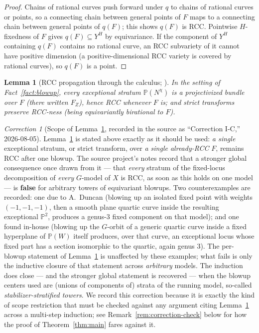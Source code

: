 \documentclass[11pt]{article}
\theoremstyle{plain}
\newtheorem{lemma}[theorem]{Lemma}
\theoremstyle{definition}
\theoremstyle{remark}
\newtheorem{correction}[theorem]{Correction}
\newcommand{\PP}{\mathbb P}
\begin{document}
\begin{proof}
Chains of rational curves push forward under $q$ to chains of rational
curves or points, so a connecting chain between general points of $F$
maps to a connecting chain between general points of $q(F)$; this
shows $q(F)$ is RCC. Pointwise $H$-fixedness of $F$ gives $q(F)\subseteq
Y^H$ by equivariance. If the component of $Y^H$ containing $q(F)$
contains no rational curve, an RCC subvariety of it cannot have
positive dimension (a positive-dimensional RCC variety is covered by
rational curves), so $q(F)$ is a point.
\end{proof}

\begin{lemma}[RCC propagation through the calculus; {\cite[Lem.\
4.3]{BComplex}}] \label{lem:rccprop} In the setting of
Fact~\ref{fact:blowup}, every exceptional stratum $\PP(N^\chi)$ is a
projectivized bundle over $F$ (there written $F_Z$), hence RCC whenever
$F$ is; and strict transforms preserve RCC-ness (being equivariantly
birational to $F$).
\end{lemma}

\begin{correction}[Scope of Lemma~\ref{lem:rccprop}, recorded in the
source as ``Correction I-C,'' 2026-08-05]
\label{corr:ic}
Lemma~\ref{lem:rccprop} is stated above exactly as it should be used:
\emph{a single} exceptional stratum, or strict transform, over \emph{a
single already-RCC} $F$, remains RCC after one blowup. The source
project's notes record that a stronger global consequence once drawn
from it --- that \emph{every} stratum of the fixed-locus decomposition
of \emph{every} $G$-model of $X$ is RCC, as soon as this holds on one
model --- is \textbf{false} for arbitrary towers of equivariant
blowups. Two counterexamples are recorded: one due to A.\ Duncan
(blowing up an isolated fixed point with weights $(-1,-1,-1)$, then a
smooth plane quartic curve inside the resulting exceptional $\PP^2$,
produces a genus-$3$ fixed component on that model); and one found
in-house (blowing up the $G$-orbit of a generic quartic curve inside a
fixed hyperplane of $\PP(W)$ itself produces, over that curve, an
exceptional locus whose fixed part has a section isomorphic to the
quartic, again genus $3$). The per-blowup statement of
Lemma~\ref{lem:rccprop} is unaffected by these examples; what fails is
only the inductive closure of that statement across \emph{arbitrary}
models. The induction does close --- and the stronger global statement
is recovered --- when the blowup centers used are (unions of
components of) strata of the running model, so-called
\emph{stabilizer-stratified towers}. We record this correction because
it is exactly the kind of scope restriction that must be checked
against any argument citing Lemma~\ref{lem:rccprop} across a multi-step
induction; see Remark~\ref{rem:correction-check} below for how the
proof of Theorem~\ref{thm:main} fares against it.
\end{correction}
\end{document}
